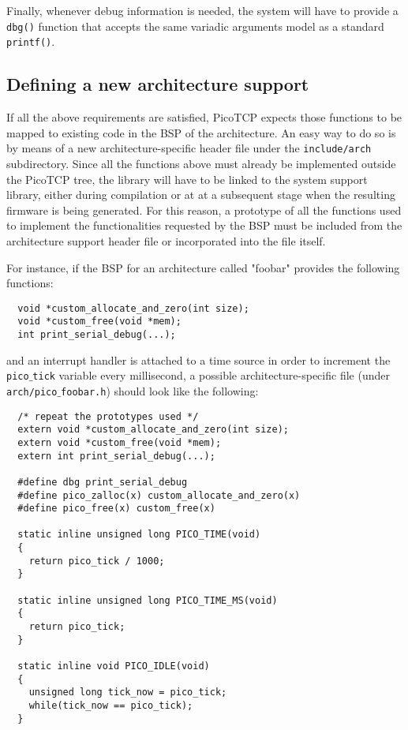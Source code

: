 Finally, whenever debug information is needed, the system will have to provide a
\texttt{dbg()} function that accepts the same variadic arguments model as a standard \texttt{printf()}.


\subsection{Defining a new architecture support}
If all the above requirements are satisfied, PicoTCP expects those
functions to be mapped to existing code in the BSP of the architecture.
An easy way to do so is by means of a new architecture-specific header
file under the \texttt{include/arch} subdirectory.
Since all the functions above must already be implemented outside the
PicoTCP tree, the library will have to be linked to the system support
library, either during compilation or at at a subsequent stage when the resulting
firmware is being generated. For this reason, a prototype of all the
functions used to implement the functionalities requested by the BSP
must be included from the architecture support header file or incorporated
into the file itself.

For instance, if the BSP for an architecture called "foobar" provides the 
following functions:
\begin{verbatim}
  void *custom_allocate_and_zero(int size);
  void *custom_free(void *mem);
  int print_serial_debug(...);
\end{verbatim}
and an interrupt handler is attached to a time source in order to increment
the \texttt{pico$\_$tick} variable every millisecond, a possible architecture-specific 
file (under \texttt{arch/pico$\_$foobar.h}) should look like the following:

\begin{verbatim}
  /* repeat the prototypes used */
  extern void *custom_allocate_and_zero(int size);
  extern void *custom_free(void *mem);
  extern int print_serial_debug(...);

  #define dbg print_serial_debug
  #define pico_zalloc(x) custom_allocate_and_zero(x)
  #define pico_free(x) custom_free(x)

  static inline unsigned long PICO_TIME(void)
  {
    return pico_tick / 1000;
  }

  static inline unsigned long PICO_TIME_MS(void)
  {
    return pico_tick;
  }

  static inline void PICO_IDLE(void)
  {
    unsigned long tick_now = pico_tick;
    while(tick_now == pico_tick);
  }

\end{verbatim}

